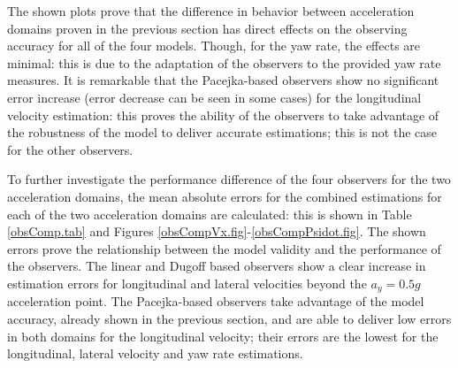 \documentclass[journal]{IEEEtran}
\begin{document}
The shown plots prove that the difference in behavior between acceleration domains proven in the previous section has direct effects on the observing accuracy for all of the four models. Though, for the yaw rate, the effects are minimal: this is due to the adaptation of the observers to the provided yaw rate measures. It is remarkable that the Pacejka-based observers show no significant error increase (error decrease can be seen in some cases) for the longitudinal velocity estimation: this proves the ability of the observers to take advantage of the robustness of the model to deliver accurate estimations; this is not the case for the other observers. 

To further investigate the performance difference of the four observers for the two acceleration domains, the mean absolute errors for the combined estimations for each of the two acceleration domains are calculated: this is shown in Table \mbox{\ref{obsComp.tab}} and Figures \mbox{\ref{obsCompVx.fig}-\ref{obsCompPsidot.fig}}. The shown errors prove the relationship between the model validity and the performance of the observers. The linear and Dugoff based observers show a clear increase in estimation errors for longitudinal and lateral velocities beyond the $a_y=0.5g$ acceleration point. The Pacejka-based observers take advantage of the model accuracy, already shown in the previous section, and are able to deliver low errors in both domains for the longitudinal velocity; their errors are the lowest for the longitudinal, lateral velocity and yaw rate estimations.
\end{document}
